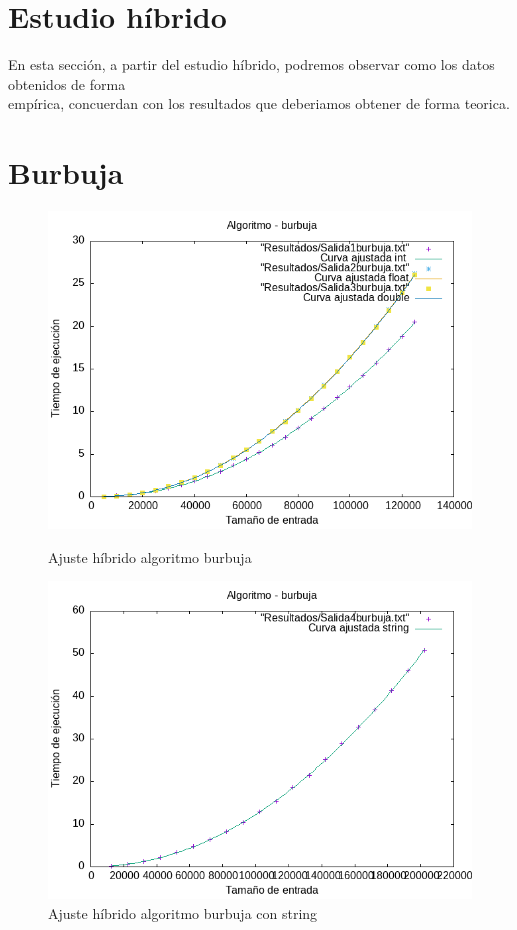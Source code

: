 \documentclass[11pt,openany]{book}
\begin{document}
\section{Estudio híbrido}
En esta sección, a partir del estudio híbrido, podremos observar como los datos obtenidos de forma \\
empírica, concuerdan con los resultados que deberiamos obtener de forma teorica.
\section*{Burbuja}
\begin{figure}[H]
    \begin{minipage}{0.5\textwidth}
        \centering
        \includegraphics[width=\linewidth]{assets/AjusteHibrido_latex/Hibridoburbuja/burbuja_hib.png}
        \caption{Ajuste híbrido algoritmo burbuja}
        \label{fig:burbuja}
    \end{minipage}%
    \begin{minipage}{0.5\textwidth}
        \centering
        \includegraphics[width=\linewidth]{assets/AjusteHibrido_latex/Hibridoburbuja/burbujastring_hib.png}
        \caption{Ajuste híbrido algoritmo burbuja con string}
        \label{fig:burbujastring}
    \end{minipage}
\end{figure}
\end{document}
